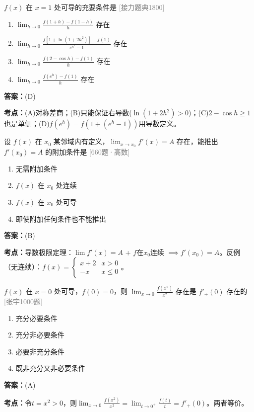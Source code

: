 \documentclass[12pt,a4paper]{ctexbook}
\newcommand{\src}[1]{\hfill\textcolor{gray}{\small\textsf{[#1]}}}
\newcommand{\ans}[1]{\begin{answerbox}\textbf{答案：}#1\end{answerbox}}
\newcommand{\kpt}[1]{\textbf{考点：}#1}
\begin{document}
\bigskip

\begin{exercise}
$f(x)$ 在 $x=1$ 处可导的充要条件是 \hfill\src{接力题典1800}
\begin{enumerate}[label=(\Alph*),nosep]
  \item $\lim_{h\to 0}\frac{f(1+h)-f(1-h)}{h}$ 存在
  \item $\lim_{h\to 0}\frac{f[1+\ln(1+2h^2)]-f(1)}{e^{h^2}-1}$ 存在
  \item $\lim_{h\to 0}\frac{f(2-\cos h)-f(1)}{h}$ 存在
  \item $\lim_{h\to 0}\frac{f(e^h)-f(1)}{h}$ 存在
\end{enumerate}
\end{exercise}
\ans{(D)}
\kpt{(A)对称差商；(B)只能保证右导数($\ln(1+2h^2)>0$)；(C)$2-\cos h\geqslant 1$也是单侧；(D)$f(e^h)=f(1+(e^h-1))$用导数定义。}

\bigskip

\begin{exercise}[660题·导数极限定理]
设 $f(x)$ 在 $x_0$ 某邻域内有定义，$\lim_{x\to x_0}f'(x)=A$ 存在，能推出 $f'(x_0)=A$ 的附加条件是 \hfill\src{660题·高数}
\begin{enumerate}[label=(\Alph*),nosep]
  \item 无需附加条件
  \item $f(x)$ 在 $x_0$ 处连续
  \item $f(x)$ 在 $x_0$ 处可导
  \item 即使附加任何条件也不能推出
\end{enumerate}
\end{exercise}
\ans{(B)}
\kpt{导数极限定理：$\lim f'(x)=A$ + $f$在$x_0$连续 $\implies f'(x_0)=A$。反例（无连续）：$f(x)=\begin{cases}x+2 & x>0\\ -x & x\leqslant 0\end{cases}$。}

\bigskip

\begin{exercise}[张宇1000题·导数定义]
$f(x)$ 在 $x=0$ 处可导，$f(0)=0$，则 $\lim_{x\to 0}\frac{f(x^2)}{x^2}$ 存在是 $f'_+(0)$ 存在的 \hfill\src{张宇1000题}
\begin{enumerate}[label=(\Alph*),nosep]
  \item 充分必要条件
  \item 充分非必要条件
  \item 必要非充分条件
  \item 既非充分又非必要条件
\end{enumerate}
\end{exercise}
\ans{(A)}
\kpt{令$t=x^2>0$，则$\lim_{x\to 0}\frac{f(x^2)}{x^2}=\lim_{t\to 0^+}\frac{f(t)}{t}=f'_+(0)$。两者等价。}
\end{document}
